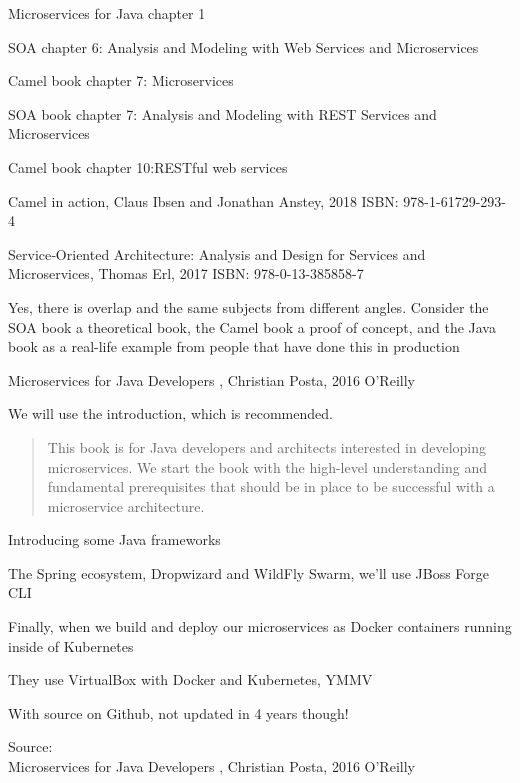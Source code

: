 \documentclass[Screen16to9,17pt]{foils}
\begin{document}
\begin{list1}
\item Microservices for Java chapter 1
\item SOA chapter 6: Analysis and Modeling with Web Services and Microservices
\item Camel book chapter 7: Microservices
\vskip 1cm
\item SOA book chapter 7: Analysis and Modeling with REST Services and Microservices
\item Camel book chapter 10:RESTful web services
\end{list1}

Camel in action, Claus Ibsen and Jonathan Anstey, 2018
ISBN: 978-1-61729-293-4

Service‑Oriented Architecture: Analysis and Design for Services and Microservices, Thomas Erl, 2017
ISBN: 978-0-13-385858-7

Yes, there is overlap and the same subjects from different angles. Consider the SOA book a theoretical book, the Camel book a proof of concept, and the Java book as a real-life example from people that have done this in production



Microservices for Java Developers , Christian Posta, 2016 O’Reilly\\

We will use the introduction, which is recommended.


\begin{quote}
This book is for Java developers and architects interested in developing microservices. We start the book with the high-level understanding and fundamental prerequisites that should be in place to be successful with a microservice architecture.
\end{quote}

Introducing some Java frameworks
\begin{list2}
\item The Spring ecosystem, Dropwizard and WildFly Swarm, we’ll use JBoss Forge CLI
\item Finally, when we build and deploy our microservices as Docker containers running inside of Kubernetes
\item They use VirtualBox with Docker and Kubernetes, YMMV
\item With source on Github, not updated in 4 years though!\\
\end{list2}
Source: {\footnotesize\\
Microservices for Java Developers , Christian Posta, 2016 O’Reilly}
\end{document}
